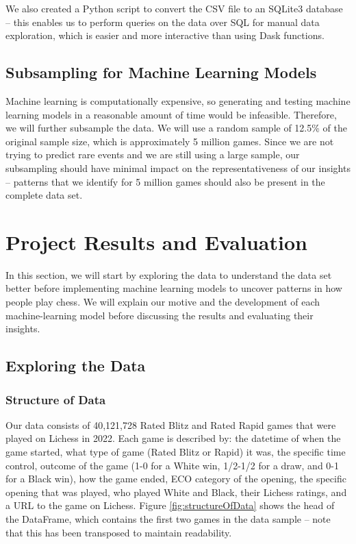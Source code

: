 \documentclass[a4paper, 11pt]{article}
\begin{document}
We also created a Python script to convert the CSV file to an SQLite3 database -- this enables us to perform queries on the data over SQL for manual data exploration, which is easier and more interactive than using Dask functions.

\subsection{Subsampling for Machine Learning Models}
Machine learning is computationally expensive, so generating and testing machine learning models in a reasonable amount of time would be infeasible. Therefore, we will further subsample the data. We will use a random sample of 12.5\% of the original sample size, which is approximately 5 million games. Since we are not trying to predict rare events and we are still using a large sample, our subsampling should have minimal impact on the representativeness of our insights -- patterns that we identify for 5 million games should also be present in the complete data set.

\section{Project Results and Evaluation}
In this section, we will start by exploring the data to understand the data set better before implementing machine learning models to uncover patterns in how people play chess. We will explain our motive and the development of each machine-learning model before discussing the results and evaluating their insights.

\subsection{Exploring the Data}

\subsubsection{Structure of Data}
Our data consists of 40,121,728 Rated Blitz and Rated Rapid games that were played on Lichess in 2022. Each game is described by: the datetime of when the game started, what type of game (Rated Blitz or Rapid) it was, the specific time control, outcome of the game (1-0 for a White win, 1/2-1/2 for a draw, and 0-1 for a Black win), how the game ended, ECO category of the opening, the specific opening that was played, who played White and Black, their Lichess ratings, and a URL to the game on Lichess. Figure \ref{fig:structureOfData} shows the head of the DataFrame, which contains the first two games in the data sample -- note that this has been transposed to maintain readability.
\end{document}
